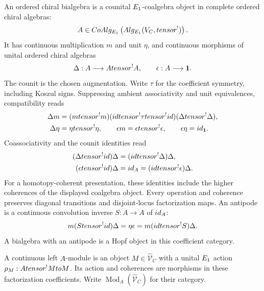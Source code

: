 \begin{definition}\label{def:vol4-ordered-chiral-bialgebra}
An ordered chiral bialgebra is a counital $E_1$-coalgebra object
in complete ordered chiral algebras:
\[
 A\in CoAlg_{E_1}
 \left(Alg_{E_1}
 (V_C,tensor^{!})\right).
\]
It has continuous multiplication $m$ and unit $\eta$, and continuous
morphisms of unital ordered chiral algebras
\[
 \Delta:A\longrightarrow Atensor^{!}A,
 \qquad \epsilon:A\longrightarrow\mathbf1.
\]
The counit is the chosen augmentation.
Write $\tau$ for the coefficient symmetry, including Koszul signs.
Suppressing ambient associativity and unit equivalences, compatibility reads
\[
\begin{aligned}
 \Delta m&=(mtensor^{!}m)
  (idtensor^{!}\tau tensor^{!}id)
  (\Delta tensor^{!}\Delta),\\
 \Delta\eta&=\eta tensor^{!}\eta,
 \qquad \epsilon m=\epsilon tensor^{!}\epsilon,
 \qquad \epsilon\eta=id_{\mathbf1}.
\end{aligned}
\]
Coassociativity and the counit identities read
\[
\begin{aligned}
 (\Delta tensor^{!}id)\Delta
   &=(idtensor^{!}\Delta)\Delta,\\
 (\epsilon tensor^{!}id)\Delta
   &=id_A=(idtensor^{!}\epsilon)\Delta.
\end{aligned}
\]
For a homotopy-coherent presentation, these identities include the
higher coherences of the displayed coalgebra object.
Every operation and coherence preserves diagonal transitions and
disjoint-locus factorization maps.
An antipode is a continuous convolution inverse $S:A\to A$ of $id_A$:
\[
 m(Stensor^{!}id)\Delta
 =\eta\epsilon
 =m(idtensor^{!}S)\Delta.
\]
A bialgebra with an antipode is a Hopf object in this coefficient category.
\end{definition}

A continuous left $A$-module is an object $M\in\widehat{\mathcal V}_C$
with a unital $E_1$ action
$\rho_M:Atensor^{!}Mto M$.
Its action and coherences are morphisms in these factorization coefficients.
Write $\operatorname{Mod}_A(\widehat{\mathcal V}_C)$ for their category.

